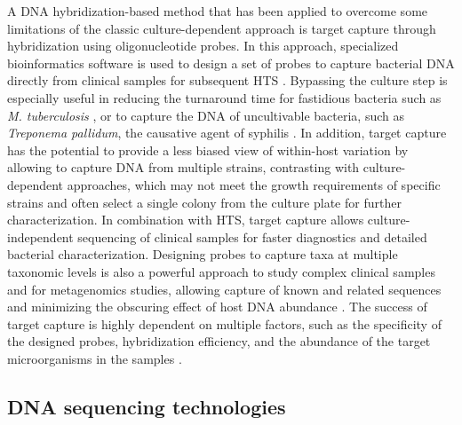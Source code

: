 A \ac{DNA} hybridization-based method that has been applied to overcome some limitations of the classic culture-dependent approach is target capture through hybridization using oligonucleotide probes. In this approach, specialized bioinformatics software is used to design a set of probes to capture bacterial \ac{DNA} directly from clinical samples for subsequent \ac{HTS} \cite{dickson_probe_2021, chafin_mrbait_2018}. Bypassing the culture step is especially useful in reducing the turnaround time for fastidious bacteria such as \textit{M. tuberculosis} \cite{macedo_molecular_2023}, or to capture the \ac{DNA} of uncultivable bacteria, such as \textit{Treponema pallidum}, the causative agent of syphilis \cite{pinto_genome-scale_2016}. In addition, target capture has the potential to provide a less biased view of within-host variation by allowing to capture \ac{DNA} from multiple strains, contrasting with culture-dependent approaches, which may not meet the growth requirements of specific strains and often select a single colony from the culture plate for further characterization. In combination with \ac{HTS}, target capture allows culture-independent sequencing of clinical samples for faster diagnostics and detailed bacterial characterization. Designing probes to capture taxa at multiple taxonomic levels is also a powerful approach to study complex clinical samples and for metagenomics studies, allowing capture of known and related sequences and minimizing the obscuring effect of host \ac{DNA} abundance \cite{dickson_probe_2021}. The success of target capture is highly dependent on multiple factors, such as the specificity of the designed probes, hybridization efficiency, and the abundance of the target microorganisms in the samples \cite{dennis_target-enrichment_2022, macedo_molecular_2023, pinto_genome-scale_2016}.

\subsection{DNA sequencing technologies} \label{ssec:introduction_dna_sequencing_technologies}

